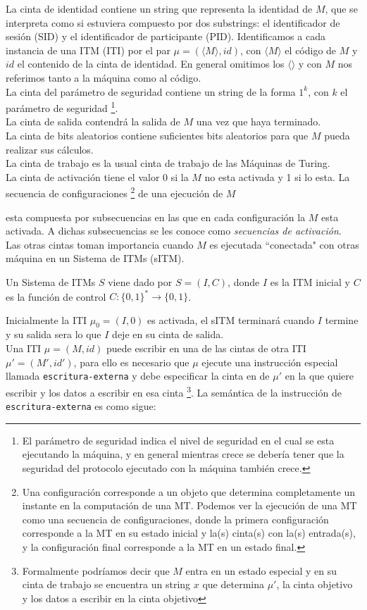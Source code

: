 La cinta de identidad contiene un string que representa la identidad de $M$, que se interpreta
como si estuviera compuesto por dos substrings: el identificador de sesión (SID) y el identificador
de participante (PID). Identificamos a cada instancia de una ITM (ITI) por el par
$\mu = (\langle M \rangle, id)$, con $\langle M \rangle$ el código de $M$ y $id$ el contenido de la cinta
de identidad. En general omitimos los $\langle \rangle$ y con $M$ nos referimos tanto a la máquina como
al código.\\
La cinta del parámetro de seguridad contiene un string de la forma $1^k$, con $k$ el parámetro de seguridad 
\footnote{El parámetro de seguridad indica el nivel de seguridad en el cual se esta ejecutando
la máquina, y en general mientras crece se debería tener que la seguridad del protocolo ejecutado
con la máquina también crece.}.\\
La cinta de salida contendrá la salida de $M$ una vez que haya terminado.\\
La cinta de bits aleatorios contiene suficientes bits aleatorios para que $M$ pueda realizar sus cálculos.\\
La cinta de trabajo es la usual cinta de trabajo de las Máquinas de Turing.\\
La cinta de activación tiene el valor 0 si la $M$ no esta activada y 1 si lo esta. La secuencia de
configuraciones
\footnote{Una configuración corresponde a un objeto que determina completamente un instante
en la computación de una MT. Podemos ver la ejecución de una MT como una secuencia de configuraciones, donde la
primera configuración corresponde a la MT en su estado inicial y la(s) cinta(s) con la(s) entrada(s), y la
configuración final corresponde a la MT en un estado final.}
de una ejecución de $M$

esta compuesta por subsecuencias en las
que en cada configuración la $M$ esta activada. A dichas subsecuencias se les conoce como \textit{secuencias
de activación}.\\
Las otras cintas toman importancia cuando $M$ es ejecutada ``conectada" con otras máquina
en un Sistema de ITMs (sITM).\\

\begin{definicion}
Un Sistema de ITMs $S$ viene dado por $S = (I, C)$, donde $I$ es la ITM inicial y $C$ es la función
de control $C:\{0,1\}^* \to \{0,1\}$.
\end{definicion}
Inicialmente la ITI $\mu_0 = (I, 0)$ es activada, el sITM terminará cuando $I$ termine y su
salida sera lo que $I$ deje en su cinta de salida.\\
Una ITI $\mu = (M, id)$ puede escribir en una de las cintas de otra ITI $\mu' = (M', id')$, 
para ello es necesario que $\mu$ ejecute una instrucción
especial llamada \texttt{escritura-externa} y debe especificar la cinta en de $\mu'$ en la que quiere
escribir y los datos a escribir en esa cinta
\footnote{Formalmente podríamos decir que $M$ entra en un estado especial y en su cinta de
trabajo se encuentra un string $x$ que determina $\mu'$, la cinta objetivo y los datos a escribir
en la cinta objetivo}.
La semántica de la instrucción de \texttt{escritura-externa} es como sigue:\\


